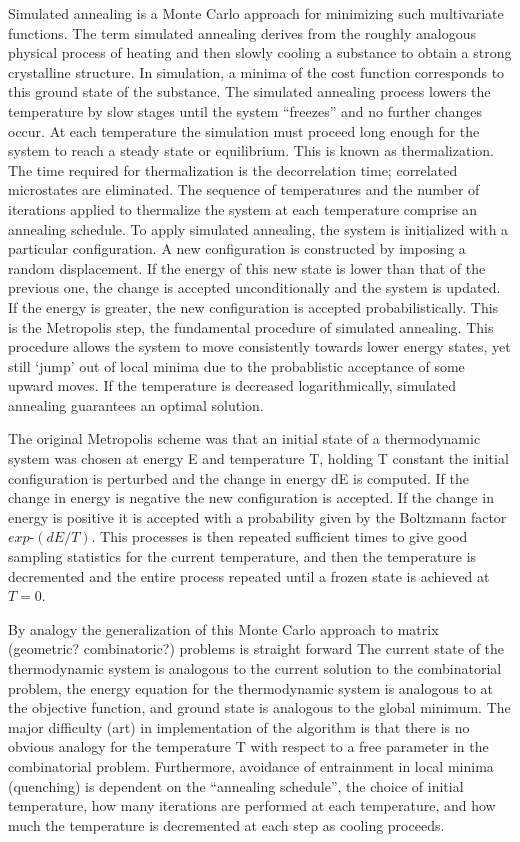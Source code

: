 \documentclass[superscriptaddress,reprint,amsmath,amssymb,aps]{revtex4-1}
\begin{document}
Simulated annealing is a Monte Carlo approach for minimizing such
multivariate functions. The term simulated annealing derives from the
roughly analogous physical process of heating and then slowly cooling a
substance to obtain a strong crystalline structure. In simulation, a minima
of the cost function corresponds to this ground state of the substance. The
simulated annealing process lowers the temperature by slow stages until the
system ``freezes'' and no further changes occur. At each temperature the
simulation must proceed long enough for the system to reach a steady state
or equilibrium. This is known as thermalization. The time required for
thermalization is the decorrelation time; correlated microstates are
eliminated. The sequence of temperatures and the number of iterations
applied to thermalize the system at each temperature comprise an annealing
schedule.  To apply simulated annealing, the system is initialized with a
particular configuration. A new configuration is constructed by imposing a
random displacement. If the energy of this new state is lower than that of
the previous one, the change is accepted unconditionally and the system is
updated. If the energy is greater, the new configuration is accepted
probabilistically. This is the Metropolis step, the fundamental procedure
of simulated annealing. This procedure allows the system to move
consistently towards lower energy states, yet still ‘jump’ out of local
minima due to the probablistic acceptance of some upward moves. If the
temperature is decreased logarithmically, simulated annealing guarantees an
optimal solution.

The original Metropolis scheme was that an initial state of a thermodynamic
system was chosen at energy E and temperature T, holding T constant the
initial configuration is perturbed and the change in energy dE is computed.
If the change in energy is negative the new configuration is accepted. If
the change in energy is positive it is accepted with a probability given by
the Boltzmann factor $exp ‐(dE/T)$.  This processes is then repeated
sufficient times to give good sampling statistics for the current
temperature, and then the temperature is decremented and the entire process
repeated until a frozen state is achieved at $T=0$.

By analogy the generalization of this Monte Carlo approach to matrix
(geometric? combinatoric?) problems is straight forward The current state
of the thermodynamic system is analogous to the current solution to the
combinatorial problem, the energy equation for the thermodynamic system is
analogous to at the objective function, and ground state is analogous to
the global minimum. The major difficulty (art) in implementation of the
algorithm is that there is no obvious analogy for the temperature T with
respect to a free parameter in the combinatorial problem. Furthermore,
avoidance of entrainment in local minima (quenching) is dependent on the
``annealing schedule'', the choice of initial temperature, how many
iterations are performed at each temperature, and how much the temperature
is decremented at each step as cooling proceeds.
\end{document}
